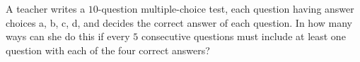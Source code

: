 A teacher writes a $10$-question multiple-choice test, each question having answer choices a, b, c, d, and decides the correct answer of each question. In how many ways can she do this if every $5$ consecutive questions must include at least one question with each of the four correct answers?
